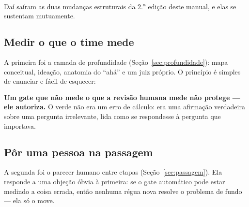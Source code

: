 \documentclass[11pt,a4paper]{article}
\begin{document}
\begin{center}
\end{center}

Daí saíram as duas mudanças estruturais da 2.\textsuperscript{a} edição deste manual, e elas se sustentam mutuamente.

\subsection{Medir o que o time mede}

A primeira foi a camada de profundidade (Seção~\ref{sec:profundidade}): mapa conceitual, ideação, anatomia do ``ahá'' e um juiz próprio. O princípio é simples de enunciar e fácil de esquecer:

\begin{destaque}
\textbf{Um gate que não mede o que a revisão humana mede não protege --- ele autoriza.} O verde não era um erro de cálculo: era uma afirmação verdadeira sobre uma pergunta irrelevante, lida como se respondesse à pergunta que importava.
\end{destaque}

\subsection{Pôr uma pessoa na passagem}

A segunda foi o parecer humano entre etapas (Seção~\ref{sec:passagem}). Ela responde a uma objeção óbvia à primeira: se o gate automático pode estar medindo a coisa errada, então nenhuma régua nova resolve o problema de fundo --- ela só o move.
\end{document}
